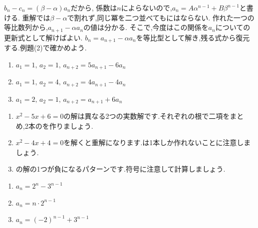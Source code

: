     $b_n-c_n=(\beta-\alpha)a_n$だから,
    \BookMathLayout{\[
      a_n=\frac{(a_2-\alpha a_1)\beta^{n-1}-(a_2-\beta a_1)\alpha^{n-1}}{\beta-\alpha}.
    \]}{\[
      \begin{aligned}
        a_n&=\frac{a_2-\alpha a_1}{\beta-\alpha}\beta^{n-1}\\
           &\quad-\frac{a_2-\beta a_1}{\beta-\alpha}\alpha^{n-1}.
      \end{aligned}
    \]}
    係数は$n$によらないので,$a_n=A\alpha^{n-1}+B\beta^{n-1}$と書ける.
    重解では$\beta-\alpha$で割れず,同じ冪を二つ並べてもにはならない.
    作れた一つの等比数列から,$a_{n+1}-\alpha a_n$の値は分かる.
    そこで,今度はこの関係を$a_n$についての更新式として解けばよい.
    $b_n=a_{n+1}-\alpha a_n$を等比型として解き,残る式から復元する.例題(2)で確かめよう.

    \noindent {}\par\nobreak
    \begin{enumerate}[label=(\arabic*),parsep=3pt,format=\bookitemlink{example-three-term-1}{problem}{answer}]
      \item $\displaystyle a_1=1,\,a_2=1,\, a_{n+2}=5a_{n+1}-6a_n$
      \item $\displaystyle a_1=1,\,a_2=4,\, a_{n+2}=4a_{n+1}-4a_n$
      \item $\displaystyle a_1=2,\,a_2=1,\, a_{n+2}=a_{n+1}+6a_n$
    \end{enumerate}

    \noindent{}\par\nobreak
    \begin{enumerate}[label=(\arabic*),parsep=3pt,format=\bookitemlink{example-three-term-1}{hint}{problem}]
      \item {}$x^2-5x+6=0$の解は異なる2つの実数解です.それぞれの根で二項をまとめ,2本のを作りましょう.
      \item {}$x^2-4x+4=0$を解くと重解になります.は1本しか作れないことに注意しましょう.
      \item {}の解の1つが負になるパターンです.符号に注意して計算しましょう.
    \end{enumerate}

    \noindent{}\par\nobreak
    \begin{enumerate}[label=(\arabic*),parsep=3pt,format=\bookitemlink{example-three-term-1}{answer}{problem}]
      \item $\displaystyle a_n=2^n-3^{n-1}$
      \item $\displaystyle a_n=n\cdot2^{n-1}$
      \item $\displaystyle a_n=(-2)^{n-1}+3^{n-1}$
    \end{enumerate}

